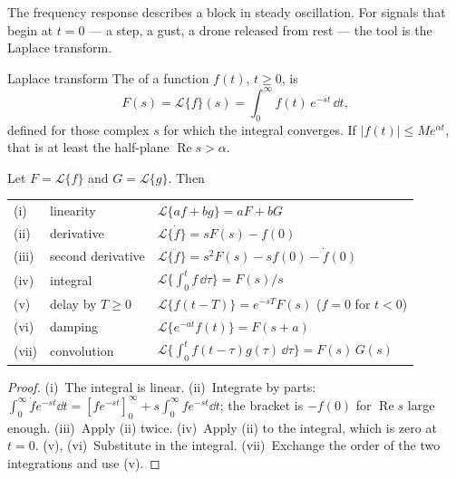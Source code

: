 The frequency response describes a block in steady oscillation. For signals that begin at $t = 0$ — a step, a gust, a drone released from rest — the tool is the Laplace transform.

\begin{definition}{Laplace transform}
The  of a function $f(t)$, $t \ge 0$, is
\begin{equation}
  F(s) = \mathcal{L}\{f\}(s) = \int_0^\infty f(t)\,e^{-st}\,\dd t ,
\end{equation}
defined for those complex $s$ for which the integral converges. If $|f(t)| \le M e^{\alpha t}$, that is at least the half-plane $\operatorname{Re}s > \alpha$.
\end{definition}

\begin{theorem}
\label{thm:C-rules}
Let $F = \mathcal{L}\{f\}$ and $G = \mathcal{L}\{g\}$. Then
\begin{center}
\renewcommand{\arraystretch}{1.4}
\begin{tabular}{@{}lll@{}}
(i) & linearity & $\mathcal{L}\{af + bg\} = aF + bG$\\
(ii) & derivative & $\mathcal{L}\{\dot f\} = sF(s) - f(0)$\\
(iii) & second derivative & $\mathcal{L}\{\ddot f\} = s^2F(s) - s f(0) - \dot f(0)$\\
(iv) & integral & $\mathcal{L}\{\int_0^t f\,\dd\tau\} = F(s)/s$\\
(v) & delay by $T \ge 0$ & $\mathcal{L}\{f(t - T)\} = e^{-sT}F(s)$ \quad ($f = 0$ for $t < 0$)\\
(vi) & damping & $\mathcal{L}\{e^{-at}f(t)\} = F(s + a)$\\
(vii) & convolution & $\mathcal{L}\{\int_0^t f(t - \tau)g(\tau)\,\dd\tau\} = F(s)\,G(s)$\\
\end{tabular}
\end{center}
\end{theorem}
\begin{proof}
(i)~The integral is linear. (ii)~Integrate by parts: $\int_0^\infty \dot f e^{-st}\dd t = [f e^{-st}]_0^\infty + s\int_0^\infty f e^{-st}\dd t$; the bracket is $-f(0)$ for $\operatorname{Re}s$ large enough. (iii)~Apply (ii) twice. (iv)~Apply (ii) to the integral, which is zero at $t = 0$. (v), (vi)~Substitute in the integral. (vii)~Exchange the order of the two integrations and use (v).
\end{proof}

